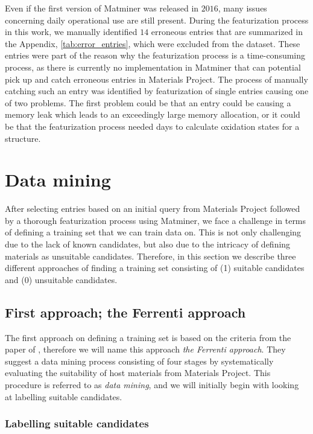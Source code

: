 Even if the first version of Matminer was released in $2016$, many issues concerning daily operational use are still present. During the featurization process in this work, we manually identified $14$ erroneous entries that are summarized in the Appendix, \autoref{tab:error_entries}, which were excluded from the dataset. These entries were part of the reason why the featurization process is a time-consuming process, as there is currently no implementation in Matminer that can potential pick up and catch erroneous entries in Materials Project. The process of manually catching such an entry was identified by featurization of single entries causing one of two problems. The first problem could be that an entry could be causing a memory leak which leads to an exceedingly large memory allocation, or it could be that the featurization process needed days to calculate oxidation states for a structure.

\section{Data mining}

After selecting entries based on an initial query from Materials Project followed by a thorough featurization process using Matminer, we face a challenge in terms of defining a training set that we can train data on. This is not only challenging due to the lack of known candidates, but also due to the intricacy of defining materials as unsuitable candidates. Therefore, in this section we describe three different approaches of finding a training set consisting of (1) suitable candidates and (0) unsuitable candidates.

\subsection{First approach; the Ferrenti approach}

The first approach on defining a training set is based on the criteria from the paper  of \citeauthor{Ferrenti2020} \cite{Ferrenti2020}, therefore we will name this approach \textit{the Ferrenti approach}. They suggest a data mining process consisting of four stages by systematically evaluating the suitability of host materials from Materials Project. This procedure is referred to as \textit{data mining}, and we will initially begin with looking at labelling suitable candidates.

\subsubsection{Labelling suitable candidates}

